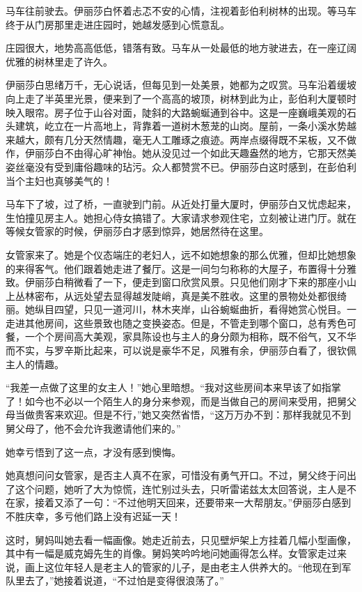 \par 马车往前驶去。伊丽莎白怀着忐忑不安的心情，注视着彭伯利树林的出现。等马车终于从门房那里走进庄园时，她越发感到心慌意乱。
\par 庄园很大，地势高高低低，错落有致。马车从一处最低的地方驶进去，在一座辽阔优雅的树林里走了许久。
\par 伊丽莎白思绪万千，无心说话，但每见到一处美景，她都为之叹赏。马车沿着缓坡向上走了半英里光景，便来到了一个高高的坡顶，树林到此为止，彭伯利大厦顿时映入眼帘。房子位于山谷对面，陡斜的大路蜿蜒通到谷中。这是一座巍峨美观的石头建筑，屹立在一片高地上，背靠着一道树木葱茏的山岗。屋前，一条小溪水势越来越大，颇有几分天然情趣，毫无人工雕琢之痕迹。两岸点缀得既不呆板，又不做作，伊丽莎白不由得心旷神怡。她从没见过一个如此天趣盎然的地方，它那天然美姿丝毫没有受到庸俗趣味的玷污。众人都赞赏不已。伊丽莎白这时感到，在彭伯利当个主妇也真够美气的！
\par 马车下了坡，过了桥，一直驶到门前。从近处打量大厦时，伊丽莎白又忧虑起来，生怕撞见房主人。她担心侍女搞错了。大家请求参观住宅，立刻被让进门厅。就在等候女管家的时候，伊丽莎白才感到惊异，她居然待在这里。
\par 女管家来了。她是个仪态端庄的老妇人，远不如她想象的那么优雅，但却比她想象的来得客气。他们跟着她走进了餐厅。这是一间匀匀称称的大屋子，布置得十分雅致。伊丽莎白稍微看了一下，便走到窗口欣赏风景。只见他们刚才下来的那座小山上丛林密布，从远处望去显得越发陡峭，真是美不胜收。这里的景物处处都很绮丽。她纵目四望，只见一道河川，林木夹岸，山谷蜿蜒曲折，看得她赏心悦目。一走进其他房间，这些景致也随之变换姿态。但是，不管走到哪个窗口，总有秀色可餐，一个个房间高大美观，家具陈设也与主人的身分颇为相称，既不俗气，又不华而不实，与罗辛斯比起来，可以说是豪华不足，风雅有余，伊丽莎白看了，很钦佩主人的情趣。
\par “我差一点做了这里的女主人！”她心里暗想。“我对这些房间本来早该了如指掌了！如今也不必以一个陌生人的身分来参观，而是当做自己的房间来受用，把舅父母当做贵客来欢迎。但是不行，”她又突然省悟，“这万万办不到：那样我就见不到舅父母了，他不会允许我邀请他们来的。”
\par 她幸亏悟到了这一点，才没有感到懊悔。
\par 她真想问问女管家，是否主人真不在家，可惜没有勇气开口。不过，舅父终于问出了这个问题，她听了大为惊慌，连忙别过头去，只听雷诺兹太太回答说，主人是不在家，接着又添了一句：“不过他明天回来，还要带来一大帮朋友。”伊丽莎白感到不胜庆幸，多亏他们路上没有迟延一天！
\par 这时，舅妈叫她去看一幅画像。她走近前去，只见壁炉架上方挂着几幅小型画像，其中有一幅是威克姆先生的肖像。舅妈笑吟吟地问她画得怎么样。女管家走过来说，画上这位年轻人是老主人的管家的儿子，是由老主人供养大的。“他现在到军队里去了，”她接着说道，“不过怕是变得很浪荡了。”
